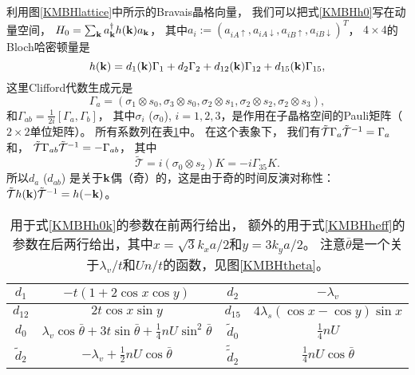 利用图\ref{KMBHlattice}中所示的Bravais晶格向量，
我们可以把式\eqref{KMBHh0}写在动量空间，
$H_0=\sum_{\vb k}a^\dagger_{\vb k}h(\vb k) a_{\vb k}$，
其中$a_i := (a_{iA\uparrow},a_{iA\downarrow},a_{iB\uparrow},a_{iB\downarrow})^T$，
$4\times 4$的Bloch哈密顿量是
\begin{equation}\label{KMBHh0k}
	h(\vb k)=d_1(\vb k)\Gamma_1+d_2 \Gamma_2+d_{12}(\vb k)\Gamma_{12}+d_{15}(\vb k)\Gamma_{15},
\end{equation}
这里Clifford代数生成元是
\begin{equation}
	\Gamma_a=(\sigma_1 \otimes s_0,\sigma_3 \otimes s_0,\sigma_2\otimes s_1, \sigma_2\otimes s_2,\sigma_2\otimes s_3),\label{gammaKMBH}
\end{equation}
和$\Gamma_{ab}=\frac{1}{2i}[\Gamma_a,\Gamma_b]$，
其中$\sigma_i$ ($\sigma_0$), $i=1,2,3$，是作用在子晶格空间的Pauli矩阵（$2\times 2$单位矩阵）。
所有系数列在表\ref{paramtab}中。
在这个表象下，
我们有$\tilde{\mathcal T} \Gamma_a \tilde{\mathcal T}^{-1} =\Gamma_a$和，
$\tilde{\mathcal T} \Gamma_{ab} \tilde{\mathcal T}^{-1} =-\Gamma_{ab}$，
其中
\begin{equation}
	\tilde{\mathcal T}=i(\sigma_0\otimes s_2) K = -i\Gamma_{35}K.\label{PTRSop1}
\end{equation}
所以$d_{a}$ ($d_{ab}$) 是关于$\vb k$偶（奇）的，这是由于奇的时间反演对称性：$\tilde{\mathcal T}h(\vb k)\tilde{\mathcal T}^{-1} = h(-\vb k)$。




\begin{table}[htb]
    \centering\small
	\caption{\label{paramtab}用于式\eqref{KMBHh0k}的参数在前两行给出，
	额外的用于式\eqref{KMBHheff}的参数在后两行给出，其中$x=\sqrt{3} k_x a/2$和$y=3 k_y a/2$。
	注意$\bar \theta$是一个关于$\lambda_v/t$和$Un/t$的函数，见图\ref{KMBHtheta}。}
	\begin{tabular}{cc|cc}
	\hline
		$d_1$ & $-t(1+2\cos x\cos y)$ & $d_2$ & $-\lambda_v$ \\
		\hline
		$d_{12}$ & $2t\cos x\sin y$ & $d_{15}$ & $4\lambda_s(\cos x-\cos y)\sin x$\\
		\hline
		$d_0$ & $\lambda_v\cos \bar \theta+3t\sin \bar \theta+\frac{1}{4}nU\sin^2 \bar \theta$ & $\tilde d_0$ & $\frac{1}{4}nU$ \\
		\hline
		$\tilde d_2$ & $-\lambda_v+\frac{1}{2}nU \cos \bar \theta$ & $\tilde{\tilde{d}}_2$ & $\frac{1}{4}nU \cos \bar \theta$\\
		\hline
	\end{tabular}
\end{table}


